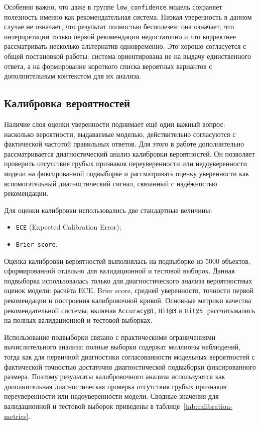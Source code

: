 Особенно важно, что даже в группе \texttt{low\_confidence} модель сохраняет полезность именно как рекомендательная
система. Низкая уверенность в данном случае не означает, что результат полностью бесполезен; она означает, что
интерпретации только первой рекомендации недостаточно и что корректнее рассматривать несколько альтернатив
одновременно. Это хорошо согласуется с общей постановкой работы: система ориентирована не на выдачу единственного
ответа, а на формирование короткого списка вероятных вариантов с дополнительным контекстом для их анализа.

\subsection{Калибровка вероятностей}

Наличие слоя оценки уверенности поднимает ещё один важный вопрос: насколько вероятности, выдаваемые моделью, действительно
согласуются с фактической частотой правильных ответов. Для этого в работе дополнительно рассматривается диагностический
анализ калибровки вероятностей. Он позволяет проверить отсутствие грубых признаков переуверенности или недоуверенности
модели на фиксированной подвыборке и рассматривать оценку уверенности как вспомогательный диагностический сигнал,
связанный с надёжностью рекомендации.

Для оценки калибровки использовались две стандартные величины:

\begin{itemize}
\tightlist
\item
  \texttt{ECE} (Expected Calibration Error);
\item
  \texttt{Brier\ score}.
\end{itemize}

Оценка калибровки вероятностей выполнялась на подвыборке из 5000 объектов, сформированной отдельно для валидационной
и тестовой выборок. Данная подвыборка использовалась только для диагностического анализа вероятностных оценок модели:
расчёта ECE, Brier score, средней уверенности, точности первой рекомендации и построения калибровочной кривой. Основные
метрики качества рекомендательной системы, включая \texttt{Accuracy@1}, \texttt{Hit@3} и \texttt{Hit@5}, рассчитывались
на полных валидационной и тестовой выборках.

Использование подвыборки связано с практическими ограничениями вычислительного анализа: полные выборки содержат
миллионы наблюдений, тогда как для первичной диагностики согласованности модельных вероятностей с фактической точностью
достаточно диагностической подвыборки фиксированного размера. Поэтому результаты калибровочного анализа используются
как дополнительная диагностическая проверка отсутствия грубых признаков
переуверенности или недоуверенности модели. Сводные значения для валидационной и тестовой выборок приведены в
таблице~\ref{tab:calibration-metrics}.

